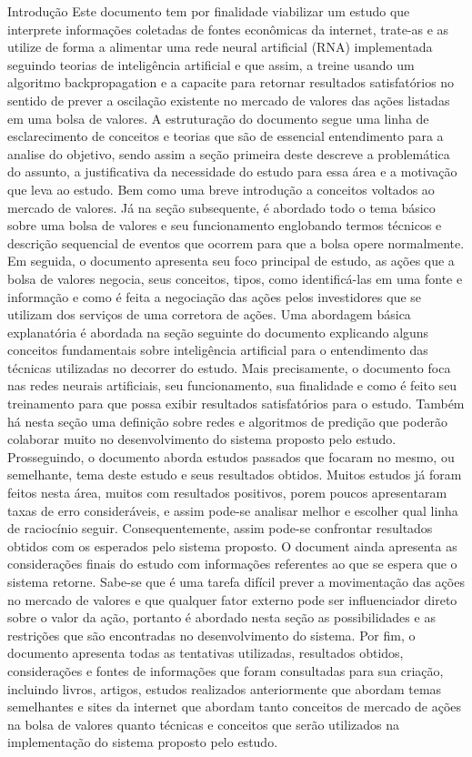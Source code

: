 \documentclass[brazil,twocolumn]{svjour3}
\begin{document}
Introdução
Este documento tem por finalidade viabilizar um estudo que interprete informações coletadas de fontes econômicas da internet, trate-as e as utilize de forma a alimentar uma rede neural artificial (RNA) implementada seguindo teorias de inteligência artificial e que assim, a treine usando um algoritmo backpropagation e a capacite para retornar resultados satisfatórios no sentido de prever a oscilação existente no mercado de valores das ações listadas em uma bolsa de valores.
A estruturação do documento segue uma linha de esclarecimento de conceitos e teorias que são de essencial entendimento para a analise do objetivo, sendo assim a seção primeira deste descreve a problemática do assunto, a justificativa da necessidade do estudo para essa área e a motivação que leva ao estudo. Bem como uma breve introdução a conceitos voltados ao mercado de valores.
Já na seção subsequente, é abordado todo o tema básico sobre uma bolsa de valores e seu funcionamento englobando termos técnicos e descrição sequencial de eventos que ocorrem para que a bolsa opere normalmente.
Em seguida, o documento apresenta seu foco principal de estudo, as ações que a bolsa de valores negocia, seus conceitos, tipos, como identificá-las em uma fonte e informação e como é feita a negociação das ações pelos investidores que se utilizam dos serviços de uma corretora de ações.
Uma abordagem básica explanatória é abordada na seção seguinte do documento explicando alguns conceitos fundamentais sobre inteligência artificial para o entendimento das técnicas utilizadas no decorrer do estudo. Mais precisamente, o documento foca nas redes neurais artificiais, seu funcionamento, sua finalidade e como é feito seu treinamento para que possa exibir resultados satisfatórios para o estudo. Também há nesta seção uma definição sobre redes e algoritmos de predição que poderão colaborar muito no desenvolvimento do sistema proposto pelo estudo.
Prosseguindo, o documento aborda estudos passados que focaram no mesmo, ou semelhante, tema deste estudo e seus resultados obtidos. Muitos estudos já foram feitos nesta área, muitos com resultados positivos, porem poucos apresentaram taxas de erro consideráveis, e assim pode-se analisar melhor e escolher qual linha de raciocínio seguir. Consequentemente, assim pode-se confrontar resultados obtidos com os esperados pelo sistema proposto.
O document ainda apresenta as considerações finais do estudo com informações referentes ao que se espera que o sistema retorne. Sabe-se que é uma tarefa difícil prever a movimentação das ações no mercado de valores e que qualquer fator externo pode ser influenciador direto sobre o valor da ação, portanto é abordado nesta seção as possibilidades e as restrições que são encontradas no desenvolvimento do sistema.
Por fim, o documento apresenta todas as tentativas utilizadas, resultados obtidos, considerações e fontes de informações que foram consultadas para sua criação, incluindo livros, artigos, estudos realizados anteriormente que abordam temas semelhantes e sites da internet que abordam tanto conceitos de mercado de ações na bolsa de valores quanto técnicas e conceitos que serão utilizados na implementação do sistema proposto pelo estudo.
\end{document}
